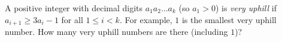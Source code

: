 A positive integer with decimal digits $a_1a_2\ldots a_k$ (so $a_1>0$) is \emph{very uphill} if $a_{i+1}\ge3a_i-1$ for all $1\le i<k$. For example, $1$ is the smallest very uphill number. How many very uphill numbers are there (including $1$)?

